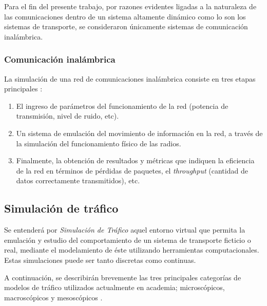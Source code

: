 Para el fin del presente trabajo, por razones evidentes ligadas a la naturaleza de las comunicaciones dentro de un sistema altamente dinámico como lo son los sistemas de transporte, se consideraron únicamente sistemas de comunicación inalámbrica.

\subsubsection{Comunicación inalámbrica}


La simulación de una red de comunicaciones inalámbrica consiste en tres etapas principales \autocite{shalaby}:
\begin{enumerate}
    \item El ingreso de parámetros del funcionamiento de la red (potencia de transmisión, nivel de ruido, etc).
    \item Un sistema de emulación del movimiento de información en la red, a través de la simulación del funcionamiento físico de las radios.
    \item Finalmente, la obtención de resultados y métricas que indiquen la eficiencia de la red en términos de pérdidas de paquetes, el \emph{throughput} (cantidad de datos correctamente transmitidos), etc.
\end{enumerate}

\subsection{Simulación de tráfico}

Se entenderá por \emph{Simulación de Tráfico} aquel entorno virtual que permita la emulación y estudio del comportamiento de un sistema de transporte ficticio o real, mediante el modelamiento de éste utilizando herramientas computacionales. Estas simulaciones puede ser tanto discretas como continuas.

A continuación, se describirán brevemente las tres principales categorías de modelos de tráfico utilizados actualmente en academia; microscópicos, macroscópicos y mesoscópicos \autocite{ratrout2009comparative,boxill2000evaluation,shalaby}.


